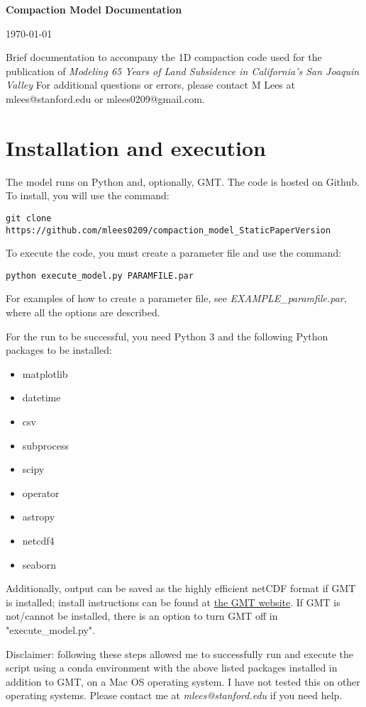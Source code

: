 \documentclass{article}
\begin{document}
\LARGE\textbf{Compaction Model Documentation}
\normalsize

\today
\author{Matt Lees\n mlees0209@gmail.com}

\abstract Brief documentation to accompany the 1D compaction code used for the publication of \textit{Modeling 65 Years of Land Subsidence in California’s San Joaquin Valley} For additional questions or errors, please contact M Lees at mlees@stanford.edu or mlees0209@gmail.com.

\tableofcontents

\section{Installation and execution}

The model runs on Python and, optionally, GMT. The code is hosted on Github. To install, you will use the command:

\verb|git clone https://github.com/mlees0209/compaction_model_StaticPaperVersion|

To execute the code, you must create a parameter file and use the command:

\verb|python execute_model.py PARAMFILE.par|

For examples of how to create a parameter file, see \textit{EXAMPLE\_paramfile.par}, where all the options are described.

For the run to be successful, you need Python 3 and the following Python packages to be installed:
\begin{itemize}
\item matplotlib
\item datetime
\item csv
\item subprocess
\item scipy
\item operator
\item astropy
\item netcdf4
\item seaborn
\end{itemize}

Additionally, output can be saved as the highly efficient netCDF format if GMT is installed; install instructions can be found at  \href{https://www.generic-mapping-tools.org/}{the GMT website}. If GMT is not/cannot be installed, there is an option to turn GMT off in "execute\_model.py".

Disclaimer: following these steps allowed me to successfully run and execute the script using a conda environment with the above listed packages installed in addition to GMT, on a Mac OS operating system. I have not tested this on other operating systems. Please contact me at \textit{mlees@stanford.edu} if you need help.
\end{document}
